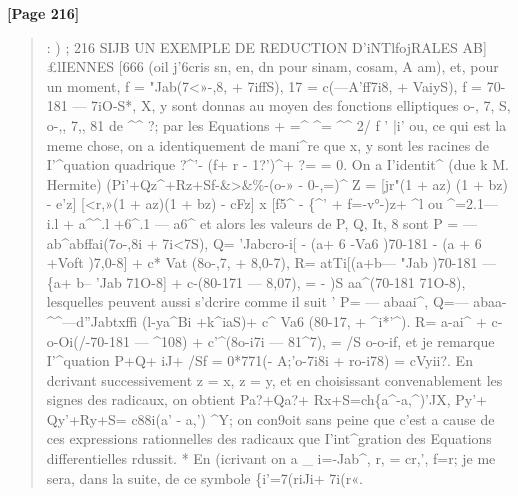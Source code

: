 \documentclass[11pt,a4paper]{book}
\begin{document}
\textbf{[Page 216]}\\[0.2cm]
\begin{quote}
: ) ;
216 SIJB UN EXEMPLE DE REDUCTION D'iNTlfojRALES AB]£lIENNES [666
(oil j'6cris sn, en, dn pour sinam, cosam, A am), et, pour un moment,
f = "Jab(7<»-,8, + 7iffS), 17 = c(---A'ff7i8, + VaiyS), f = 70-181 --- 7iO-S*,
X, y sont donnas au moyen des fonctions elliptiques o-, 7, S, o-,, 7,, 81 de \textasciicircum{}\textasciicircum{} ?; par
les Equations
+ =\textasciicircum{} \textasciicircum{}=
\textasciicircum{}\textasciicircum{} 2/ f ' |i'
ou, ce qui est la meme chose, on a identiquement
de mani\textasciicircum{}re que x, y sont les racines de I'\textasciicircum{}quation quadrique
?\textasciicircum{}'- (f+ r - 1?')\textasciicircum{}+ ?= = 0.
On a I'identit\textasciicircum{} (due k M. Hermite)
(Pi'+Qz\textasciicircum{}+Rz+Sf-\&>\&\%-(o-» -
0-,=)\textasciicircum{}
Z
= [jr"(1 + az) (1 + bz) - e'z] [<r,»(1 + az)(1 + bz) - cFz] x [f5\textasciicircum{} - \{\textasciicircum{}' + f=-v°-)z+ \textasciicircum{}l
ou
\textasciicircum{}=2.1--- i.l + a\textasciicircum{}\textasciicircum{}.l +6\textasciicircum{}.1 --- a6\textasciicircum{}
et alors les valeurs de P, Q, It, 8 sont
P = --- ab\textasciicircum{}abffai(7o-,8i + 7i<7S),
Q= 'Jabcro-i[ - (a+ 6 -Va6 )70-181 - (a + 6 +Voft )7,0-8] + c* Vat (8o-,7, + 8,0-7),
R= atTi[(a+b--- "Jab )70-181 ---\{a+ b-- 'Jab 71O-8] + c-(80-171 --- 8,07),
= -
)S aa\textasciicircum{}(70-181 71O-8),
lesquelles peuvent aussi s'dcrire comme il suit '
P= ---
abaai\textasciicircum{},
Q=--- abaa-\textasciicircum{}\textasciicircum{}---d''Jabtxffi (l-ya\textasciicircum{}Bi +k\textasciicircum{}iaS)+ c\textasciicircum{} Va6 (80-17, + \textasciicircum{}i*'\textasciicircum{}).
R= a-ai\textasciicircum{} + c-o-Oi(/-70-181 --- \textasciicircum{}108) + c'\textasciicircum{}(8o-i7i --- 81\textasciicircum{}7),
=
/S o-o-if,
et je remarque I'\textasciicircum{}quation
P+Q+ iJ+ /Sf = 0*771(- A;'o-7i8i + ro-i78)
=
cVyii?.
En dcrivant successivement z = x, z = y, et en choisissant convenablement les signes
des radicaux, on obtient
Pa?+Qa?+ Rx+S=ch\{a\textasciicircum{}-a,\textasciicircum{})'JX,
Py'+ Qy'+Ry+S=
c88i(a'
-
a,')
\textasciicircum{}Y;
on con9oit sans peine que c'est a cause de ces expressions rationnelles des radicaux
que I'int\textasciicircum{}gration des Equations differentielles rdussit.
* En (icrivant
on a \_
i=-Jab\textasciicircum{}, r, = cr,', f=r;
je me sera, dans la suite, de ce symbole
\{i'=7(riJi+
7i(r«.
\end{quote}
\end{document}
